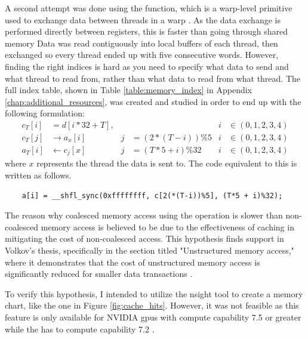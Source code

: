 A second attempt was done using the  function, which is a warp-level primitive used to exchange data between threads in a warp \cite{linUsingCUDAWarpLevel2018}.
As the data exchange is performed directly between registers, this is faster than going through shared memory \cite{linUsingCUDAWarpLevel2018}
Data was read contiguously into local buffers of each thread, then exchanged so every thread ended up with five consecutive words.
However, finding the right indices is hard as you need to specify what data to send and what thread to read from, rather than what data to read from what thread.
The full index table, shown in Table \ref{table:memory_index} in Appendix \ref{chap:additional_resources}, was created and studied in order to end up with the following formulation:
\begin{align}
    c_T[i] & = d[i*32+T],       &   &                   & i & \in (0,1,2,3,4) \\
    c_T[j] & \rightarrow a_x[i] & j & = (2 * (T -i))\%5 & i & \in (0,1,2,3,4) \\
    a_T[i] & \leftarrow c_j[x]  & j & = (T*5 + i)\%32   & i & \in (0,1,2,3,4)
    \label{eq:contiguous_reading_shfl}
\end{align}
where $x$ represents the thread the data is sent to.
The code equivalent to this is written as follows.
\begin{verbatim}
    a[i] = __shfl_sync(0xffffffff, c[2(*(T-i))%5], (T*5 + i)%32);
\end{verbatim}



The reason why coalesced memory access using the  operation is slower than non-coalesced memory access is believed to be due to the effectiveness of caching in mitigating the cost of non-coalesced access. This hypothesis finds support in Volkov's thesis, specifically in the section titled "Unstructured memory access," where it demonstrates that the cost of unstructured memory access is significantly reduced for smaller data transactions \cite[Sec 6.7]{volkovLatencyHiding2016}.

To verify this hypothesis, I intended to utilize the \gls{nsight} tool to create a memory chart, like the one in Figure \ref{fig:cache_hits}. However, it was not feasible as this feature is only available for NVIDIA \glspl{gpu} with compute capability 7.5 or greater while the \jx has to compute capability 7.2 \cite{crovellaUsingNsightCompute2019}\cite{CUDA2023}.


